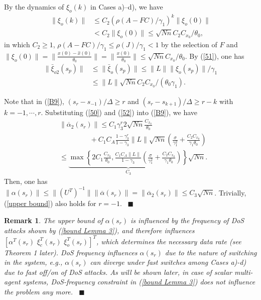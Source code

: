 \documentclass[letterpaper,journal,final,twocolumn]{IEEEtran}
\def\qedp{\hspace*{\fill}~{\tiny $\blacksquare$}}
\newtheorem{itremark}{Remark}
\newenvironment{remark}{\begin{itremark}\rm}{\end{itremark}}
\begin{document}
By the dynamics of $\xi_o(k)$ in Cases a)--d), we have
\begin{align}\label{51}
\|\xi_o(k)\| &\le C_2 (\rho(A-FC)/\gamma_1)^k \|\xi_o(0)\| \nonumber\\
&< C_2 \|\xi_o(0)\| \le  \sqrt{Nn} C_2 C_{x_0} /\theta_0, 
\end{align}
in which $C_2 \ge 1$, $\rho(A-FC)/\gamma_1 \le \rho(J)/\gamma_1<1$ by the selection of $F$ and $\|\xi_o(0)\| = \|\frac{x(0)-\hat x(0)}{\theta_0}\|=\|\frac{x(0)}{\theta_0}\|\le \sqrt{Nn}C_{x_0}/\theta_0$. By (\ref{51}), one has 
\begin{align}\label{52}
\| \bar \xi_{o2}(s_p)\| & \le\| \bar \xi_{o}(s_p)\| \le  \|L\| \|\xi_o(s_p)\| / \gamma_1  \nonumber\\
&\le \|L\| \sqrt{Nn}  C_2 C_{x_0} /(\theta_0 \gamma_1).
\end{align}




Note that in (\ref{B9}), $(s_r - s_{-1})/\Delta \ge r$ and $(s_r - s_{k+1})/ \Delta  \ge r-k$ with $k=-1, \cdots, r$. 
Substituting (\ref{50}) and (\ref{52}) into (\ref{B9}), we have
\begin{align}\label{upper bound}
&\|\overline \alpha_2 (s_{r}) \|  \le C_1  \gamma_3    ^r 2\sqrt{Nn} \frac{C_{x_0}}{\theta_0} \nonumber\\
& \quad \quad\quad \quad\,\, + C_1 C_A \frac{1-  \gamma_3  ^r}{1-\gamma_3 } \|L\| \sqrt{Nn}\left(\frac{\sigma}{\gamma_1 ^2} + \frac{C_2 C_{x_0}}{\gamma_1 \theta_0}\right)   \nonumber\\
&\! \le \underbrace{\max \left\{\! 2C_1 \frac{C_{x_0}}{\theta_0} , \frac{C_1 C_A \|L\|}{1-\gamma_3 }  \left(\! \frac{\sigma}{\gamma_1 ^2} + \frac{C_2 C_{x_0}}{\gamma_1 \theta_0}\right) \! \right\}  } _{C_3} \sqrt{Nn}.
\end{align}
Then, one has 
$
\|\alpha(s_r)\| \le \|( U   ^T) ^ {-1}\| \|\overline \alpha(s_r)\|  
=\|\overline \alpha_2(s_r) \|  \le C_3 \sqrt{Nn} $. Trivially, (\ref{upper bound}) also holds for $r=-1$.
\qedp





\begin{remark}\label{remark 2}
	The upper bound of $\alpha(s_r)$ is influenced by the frequency of DoS attacks shown by (\ref{bound Lemma 3}), and therefore influences $[\alpha ^ T (s_r)\,\,\xi_c ^ T (s_r)\,\,\xi_o ^ T (s_r) ]^T$, which determines the necessary data rate (see Theorem 1 later). 
	DoS frequency influences $\alpha(s_r)$ due to the nature of switching in the system, e.g., $\alpha(s_r)$ can diverge under fast switches among Cases a)-d) due to fast off/on of DoS attacks. 
	As will be shown later, in case of scalar multi-agent systems, DoS-frequency constraint in (\ref{bound Lemma 3}) does not influence the problem any more. \qedp
\end{remark}
\end{document}
